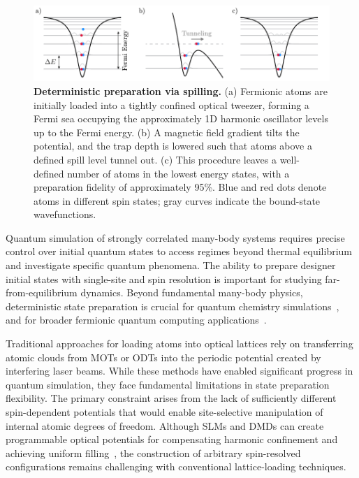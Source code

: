 

\begin{figure}
    \centering
    \includegraphics{fig-ai/preparation.pdf}
    \caption[Deterministic preparation via spilling]{
        \textbf{Deterministic preparation via spilling.}
        (a) Fermionic atoms are initially loaded into a tightly confined optical tweezer, forming a Fermi sea occupying the approximately 1D harmonic oscillator levels up to the Fermi energy. 
        (b) A magnetic field gradient tilts the potential, and the trap depth is lowered such that atoms above a defined spill level tunnel out. 
        (c) This procedure leaves a well-defined number of atoms in the lowest energy states, with a preparation fidelity of approximately 95\%. 
        Blue and red dots denote atoms in different spin states; gray curves indicate the bound-state wavefunctions.
    }
    \label{fig:preparation}
\end{figure}


Quantum simulation of strongly correlated many-body systems requires precise control over initial quantum states to access regimes beyond thermal equilibrium and investigate specific quantum phenomena. The ability to prepare designer initial states with single-site and spin resolution is important for studying far-from-equilibrium dynamics. Beyond fundamental many-body physics, deterministic state preparation is crucial for quantum chemistry simulations~\cite{gkritsis_simulating_2025}, and for broader fermionic quantum computing applications~\cite{gonzalez-cuadra_fermionic_2023}.

Traditional approaches for loading atoms into optical lattices rely on transferring atomic clouds from MOTs or ODTs into the periodic potential created by interfering laser beams. While these methods have enabled significant progress in quantum simulation, they face fundamental limitations in state preparation flexibility. The primary constraint arises from the lack of sufficiently different spin-dependent potentials that would enable site-selective manipulation of internal atomic degrees of freedom. Although SLMs and DMDs can create programmable optical potentials for compensating harmonic confinement and achieving uniform filling~\cite{mazurenko_cold-atom_2017}, the construction of arbitrary spin-resolved configurations remains challenging with conventional lattice-loading techniques.

